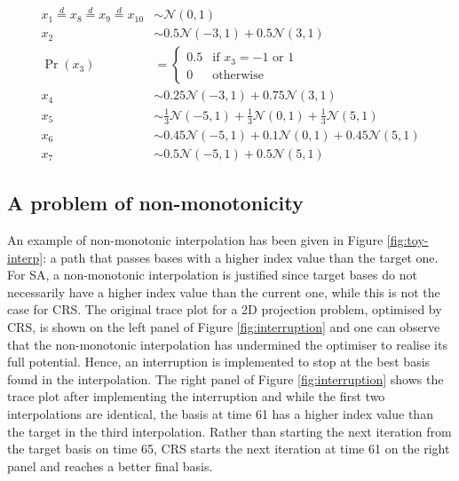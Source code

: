 \begin{align}
x_1 \overset{d}{=} x_8 \overset{d}{=} x_9 \overset{d}{=} x_{10}& \sim \mathcal{N}(0, 1) \label{eq:sim-norm} \\
x_2 &\sim 0.5 \mathcal{N}(-3, 1) + 0.5 \mathcal{N}(3, 1)\label{eq:sim-x2}\\
\Pr(x_3) &= 
\begin{cases}
0.5 & \text{if $x_3 = -1$ or $1$}\\
0 & \text{otherwise}
\end{cases}\label{eq:sim-x3}\\
x_4 &\sim 0.25 \mathcal{N}(-3, 1) + 0.75 \mathcal{N}(3, 1) \label{eq:sim-x4}\\
x_5 &\sim \frac{1}{3} \mathcal{N}(-5, 1) + \frac{1}{3} \mathcal{N}(0, 1) + \frac{1}{3} \mathcal{N}(5, 1)\label{eq:sim-x5}\\
x_6 &\sim 0.45 \mathcal{N}(-5, 1) + 0.1 \mathcal{N}(0, 1) + 0.45 \mathcal{N}(5, 1)\label{eq:sim-x6}\\
x_7 &\sim 0.5 \mathcal{N}(-5, 1) + 0.5 \mathcal{N}(5, 1) 
\label{eq:sim-x7}
\end{align}

\hypertarget{monotonic}{%
\subsection{A problem of non-monotonicity}\label{monotonic}}

An example of non-monotonic interpolation has been given in Figure
\ref{fig:toy-interp}: a path that passes bases with a higher index value
than the target one. For SA, a non-monotonic interpolation is justified
since target bases do not necessarily have a higher index value than the
current one, while this is not the case for CRS. The original trace plot
for a 2D projection problem, optimised by CRS, is shown on the left
panel of Figure \ref{fig:interruption} and one can observe that the
non-monotonic interpolation has undermined the optimiser to realise its
full potential. Hence, an interruption is implemented to stop at the
best basis found in the interpolation. The right panel of Figure
\ref{fig:interruption} shows the trace plot after implementing the
interruption and while the first two interpolations are identical, the
basis at time 61 has a higher index value than the target in the third
interpolation. Rather than starting the next iteration from the target
basis on time 65, CRS starts the next iteration at time 61 on the right
panel and reaches a better final basis.

